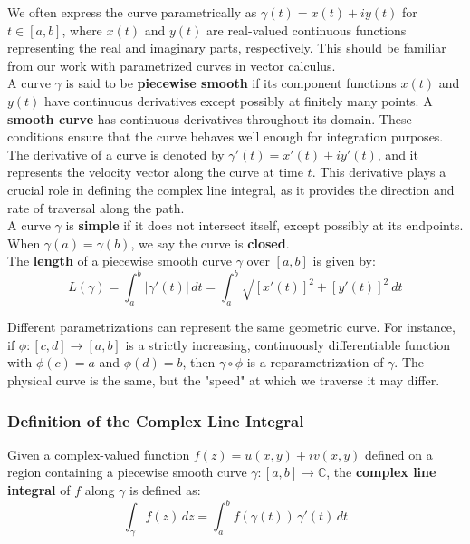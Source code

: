 \noindent We often express the curve parametrically as $\gamma(t) = x(t) + iy(t)$ for $t \in [a,b]$, where $x(t)$ and $y(t)$ are real-valued continuous functions representing the real and imaginary parts, respectively. This should be familiar from our work with parametrized curves in vector calculus. \\

\noindent A curve $\gamma$ is said to be \textbf{piecewise smooth} if its component functions $x(t)$ and $y(t)$ have continuous derivatives except possibly at finitely many points. A \textbf{smooth curve} has continuous derivatives throughout its domain. These conditions ensure that the curve behaves well enough for integration purposes. \\

\noindent The derivative of a curve is denoted by $\gamma'(t) = x'(t) + iy'(t)$, and it represents the velocity vector along the curve at time $t$. This derivative plays a crucial role in defining the complex line integral, as it provides the direction and rate of traversal along the path. \\

\noindent A curve $\gamma$ is \textbf{simple} if it does not intersect itself, except possibly at its endpoints. When $\gamma(a) = \gamma(b)$, we say the curve is \textbf{closed}. \\

\noindent The \textbf{length} of a piecewise smooth curve $\gamma$ over $[a,b]$ is given by:
\[
L(\gamma) = \int_a^b |\gamma'(t)| \, dt = \int_a^b \sqrt{[x'(t)]^2 + [y'(t)]^2} \, dt
\]

\noindent Different parametrizations can represent the same geometric curve. For instance, if $\phi: [c,d] \to [a,b]$ is a strictly increasing, continuously differentiable function with $\phi(c) = a$ and $\phi(d) = b$, then $\gamma \circ \phi$ is a reparametrization of $\gamma$. The physical curve is the same, but the "speed" at which we traverse it may differ.



\subsubsection*{Definition of the Complex Line Integral} 

\noindent Given a complex-valued function $f(z) = u(x,y) + iv(x,y)$ defined on a region containing a piecewise smooth curve $\gamma: [a,b] \to \mathbb{C}$, the \textbf{complex line integral} of $f$ along $\gamma$ is defined as:
\[
\int_{\gamma} f(z) \, dz = \int_a^b f(\gamma(t)) \, \gamma'(t) \, dt
\]

